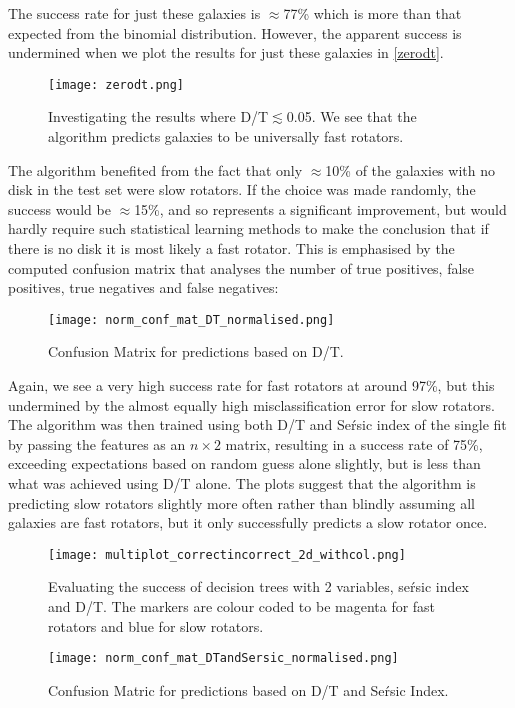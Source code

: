 The success rate for just these galaxies is $\approx$77\% which is more than that expected from the binomial distribution. However, the apparent success is undermined when we plot the results for just these galaxies in \ref{zerodt}.
\begin{figure}[h!]
	\centering
	\texttt{[image: zerodt.png]}
	\caption{Investigating the results where D/T$\lesssim $0.05. We see that the algorithm predicts galaxies to be universally fast rotators.
	}
	\label{fig:zerodt}
\end{figure}
The algorithm benefited from the fact that only $\approx$10\% of the galaxies with no disk in the test set were slow rotators. If the choice was made randomly, the success would be $\approx$15\%, and so represents a significant improvement, but would hardly require such statistical learning methods to make the conclusion that if there is no disk it is most likely a fast rotator.
This is emphasised by the computed confusion matrix that analyses the number of true positives, false positives, true negatives and false negatives:
\begin{figure}[h!]
	\centering
	\texttt{[image: norm\_conf\_mat\_DT\_normalised.png]}
	\caption{Confusion Matrix for predictions based on D/T.
	}
	\label{fig:confmatDT}
\end{figure}
Again, we see a very high success rate for fast rotators at around 97\%, but this undermined by the almost equally high misclassification error for slow rotators.
The algorithm was then trained using both D/T and Se\'rsic index of the single fit by passing the features as an $n\times 2$ matrix, resulting in a success rate of 75\%, exceeding expectations based on random guess alone slightly, but is less than what was achieved using D/T alone. The plots suggest that the algorithm is predicting slow rotators slightly more often rather than blindly assuming all galaxies are fast rotators, but it only successfully predicts a slow rotator once.
\begin{figure}[h!]
	\centering
	\texttt{[image: multiplot\_correctincorrect\_2d\_withcol.png]}
	\caption{Evaluating the success of decision trees with 2 variables, se\'rsic index and D/T. The markers are colour coded to be magenta for fast rotators and blue for slow rotators.
	}
	\label{fig:correctvsincorrect}
\end{figure}
\begin{figure}[h!]
	\centering
	\texttt{[image: norm\_conf\_mat\_DTandSersic\_normalised.png]}
	\caption{Confusion Matric for predictions based on D/T and Se\'rsic Index.
	}
	\label{fig:confmatDT}
\end{figure}
